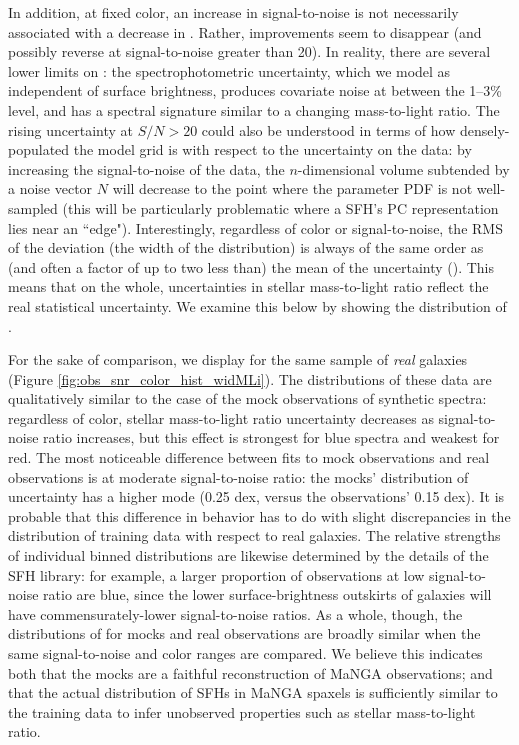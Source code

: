 In addition, at fixed color, an increase in signal-to-noise is not necessarily associated with a decrease in . Rather, improvements seem to disappear (and possibly reverse at signal-to-noise greater than 20). In reality, there are several lower limits on : the spectrophotometric uncertainty, which we model as independent of surface brightness, produces covariate noise at between the 1--3\% level, and has a spectral signature similar to a changing mass-to-light ratio. The rising uncertainty at $S/N > 20$ could also be understood in terms of how densely-populated the model grid is with respect to the uncertainty on the data: by increasing the signal-to-noise of the data, the $n$-dimensional volume subtended by a noise vector $N$ will decrease to the point where the parameter PDF is not well-sampled (this will be particularly problematic where a SFH's PC representation lies near an ``edge"). Interestingly, regardless of color or signal-to-noise, the RMS of the deviation (the width of the  distribution) is always of the same order as (and often a factor of up to two less than) the mean of the uncertainty (). This means that on the whole, uncertainties in stellar mass-to-light ratio reflect the real statistical uncertainty. We examine this below by showing the distribution of .

For the sake of comparison, we display  for the same sample of \emph{real} galaxies (Figure \ref{fig:obs_snr_color_hist_widMLi}). The distributions of these data are qualitatively similar to the case of the mock observations of synthetic spectra: regardless of color, stellar mass-to-light ratio uncertainty decreases as signal-to-noise ratio increases, but this effect is strongest for blue spectra and weakest for red. The most noticeable difference between fits to mock observations and real observations is at moderate signal-to-noise ratio: the mocks' distribution of uncertainty has a higher mode (0.25 dex, versus the observations' 0.15 dex). It is probable that this difference in behavior has to do with slight discrepancies in the distribution of training data with respect to real galaxies. The relative strengths of individual binned distributions are likewise determined by the details of the SFH library: for example, a larger proportion of observations at low signal-to-noise ratio are blue, since the lower surface-brightness outskirts of galaxies will have commensurately-lower signal-to-noise ratios. As a whole, though, the distributions of  for mocks and real observations are broadly similar when the same signal-to-noise and color ranges are compared. We believe this indicates both that the mocks are a faithful reconstruction of MaNGA observations; and that the actual distribution of SFHs in MaNGA spaxels is sufficiently similar to the training data to infer unobserved properties such as stellar mass-to-light ratio.

